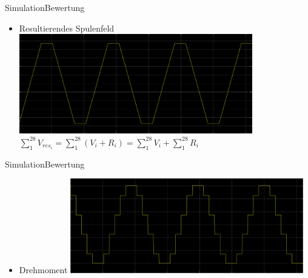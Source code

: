 	\begin{frame}{Simulation}{Bewertung}
		\begin{itemize}
			\item Resultierendes Spulenfeld
				\includegraphics[width=0.8\textwidth]{../sim/pictures/resultierendesFeld.png}
				\newline
				$\sum \limits_1^{28} V_{res_i} = \sum \limits_1^{28} (V_i+R_i) = \sum \limits_1^{28} V_i + \sum \limits_1^{28} R_i$
		\end{itemize}	 
	\end{frame}

	\begin{frame}{Simulation}{Bewertung}
		\begin{itemize}
			\item Drehmoment
			\includegraphics[width=0.8\textwidth]{../sim/pictures/drehmoment.png}
		\end{itemize}
	
	\end{frame}